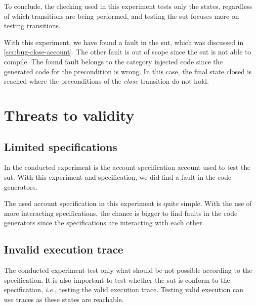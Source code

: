 To conclude, the checking used in this experiment tests only the states, regardless of which transitions are
being performed, and testing the \gls{sut} focuses more on testing transitions.

With this experiment, we have found a fault in the \gls{sut}, which was
discussed in \autoref{sec:bug-close-account}. The other fault is out of scope
since the \gls{sut} is not able to compile. The found fault belongs to the category
injected code since the generated code for the precondition is wrong. In this
case, the final state closed is reached where the preconditions of the \textit{close}
transition do not hold.

\section{Threats to validity}

\subsection*{Limited specifications}
In the conducted experiment is the account specification account used
to test the \gls{sut}. With this experiment and specification,
we did find a fault in the code generators.

The used account specification in this experiment is quite simple. With the use
of more interacting specifications, the chance is bigger to find faults in the code
generators since the specifications are interacting with each other.

\subsection*{Invalid execution trace}
The conducted experiment test only what should be not possible according to the
specification. It is also important to test whether the \gls{sut} is conform to the
specification, \textit{i.e.}, testing the valid execution trace.
Testing valid execution can use traces as these states are reachable.
